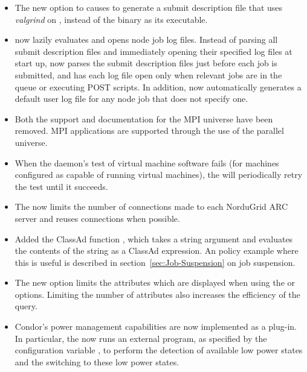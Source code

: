 \begin{itemize}
\item The new  option to 
causes  to generate a submit description file that
uses \emph{valgrind} on , instead of the 
binary as its executable.

\item {} now lazily evaluates and opens node job log files.
Instead of parsing all submit description files and 
immediately opening their specified log files at start up,
 now parses
the submit description files just before each job is submitted,
and has each log file open only when relevant jobs are in the queue
or executing POST scripts.
In addition,  now automatically generates a default user log
file for any node job that does not specify one.

\item Both the support and documentation for the MPI universe have been removed.
MPI applications are supported through the use of the parallel universe.

\item When the  daemon's test of virtual machine software fails
(for machines configured as capable of running virtual machines),
the  will periodically retry the test until it succeeds.

\item The  now limits the number of connections
made to each NorduGrid ARC server and reuses connections when possible.

\item Added the ClassAd function , which takes a string
argument and evaluates the contents of the string as a ClassAd
expression.  An policy example where this is useful is described in
section~\ref{sec:Job-Suspension} on job suspension.

\item The new  option  limits the
attributes which are displayed when using the  or 
options.
Limiting the number of attributes also increases the efficiency of the query.

\item Condor's power management capabilities are now implemented as a
  plug-in.  In particular, the  now runs an
  external program, as specified by the configuration variable
  ,
  to perform the detection of available low power states and the
  switching to these low power states.


\end{itemize}
